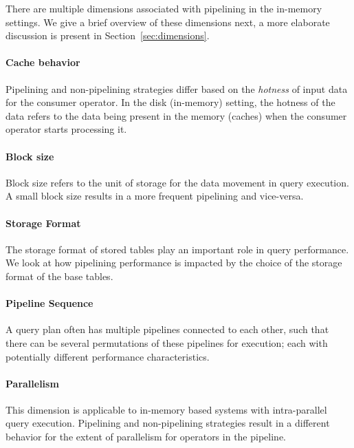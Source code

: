 There are multiple dimensions associated with pipelining in the in-memory settings.
We give a brief overview of these dimensions next, a more elaborate discussion is present in Section~\ref{sec:dimensions}.
\paragraph*{\textbf{Cache behavior}} 
Pipelining and non-pipelining strategies differ based on the \textit{hotness} of input data for the consumer operator. 
In the disk (in-memory) setting, the hotness of the data refers to the data being present in the memory (caches) when the consumer operator starts processing it.

\paragraph*{{\bf Block size}}
Block size refers to the unit of storage for the data movement in query execution. 
A small block size results in a more frequent pipelining and vice-versa.

\paragraph*{\textbf{Storage Format}}
The storage format of stored tables play an important role in query performance. 
We look at how pipelining performance is impacted by the choice of the storage format of the base tables. %


\paragraph*{\textbf{Pipeline Sequence}}
A query plan often has multiple pipelines connected to each other, such that there can be several permutations of these pipelines for execution; each with potentially different performance characteristics. 

\paragraph*{\bf{Parallelism}} 
This dimension is applicable to in-memory based systems with intra-parallel query execution.
Pipelining and non-pipelining strategies result in a different behavior for the extent of parallelism for operators in the pipeline.

